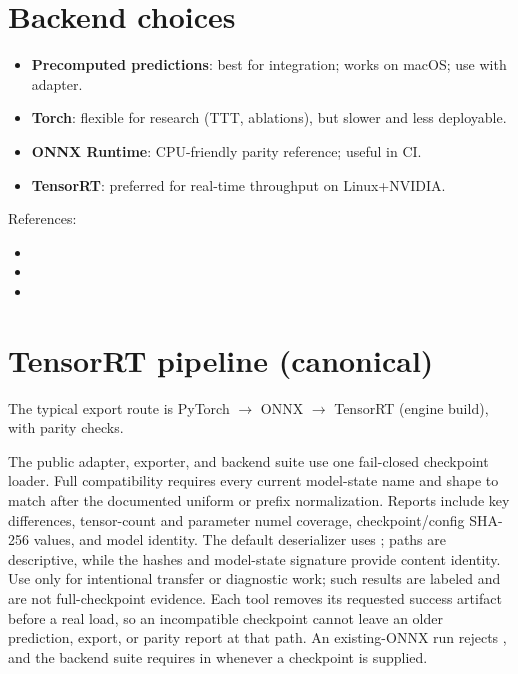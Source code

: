 \section{Backend choices}
\begin{itemize}
  \item \textbf{Precomputed predictions}: best for integration; works on macOS; use  with  adapter.
  \item \textbf{Torch}: flexible for research (TTT, ablations), but slower and less deployable.
  \item \textbf{ONNX Runtime}: CPU-friendly parity reference; useful in CI.
  \item \textbf{TensorRT}: preferred for real-time throughput on Linux+NVIDIA.
\end{itemize}

References:
\begin{itemize}
  \item {}
  \item {}
  \item {}
\end{itemize}

\section{TensorRT pipeline (canonical)}
The typical export route is PyTorch $\rightarrow$ ONNX $\rightarrow$ TensorRT (engine build), with parity checks.

The public adapter, exporter, and backend suite use one fail-closed checkpoint
loader. Full compatibility requires every current model-state name and shape
to match after the documented uniform  or  prefix
normalization. Reports include key differences, tensor-count and parameter
numel coverage, checkpoint/config SHA-256 values, and model identity. The
default deserializer uses ; paths are descriptive, while
the hashes and model-state signature provide content identity. Use
 only for intentional transfer or diagnostic
work; such results are labeled  and are not
full-checkpoint evidence. Each tool removes its requested success artifact
before a real load, so an incompatible checkpoint cannot leave an older
prediction, export, or parity report at that path. An existing-ONNX
 run rejects , and the backend suite requires
 in  whenever a checkpoint is supplied.

